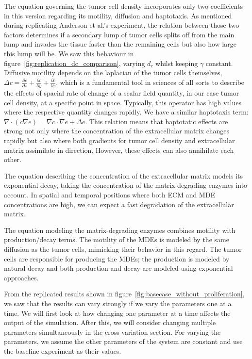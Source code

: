 The equation governing the tumor cell density incorporates only two coefficients in this version regarding its motility, diffusion and haptotaxis. As mentioned during replicating Anderson et al.'s experiment, the relation between those two factors determines if a secondary lump of tumor cells splits off from the main lump and invades the tissue faster than the remaining cells but also how large this lump will be. We saw this behaviour in figure~\ref{fig:replication_dc_comparison}, varying $d_c$ whilst keeping $\gamma$ constant. Diffusive motility depends on the laplacian of the tumor cells themselves, $\Delta c = \frac{\partial c}{\partial x} + \frac{\partial c}{\partial y} + \frac{\partial c}{\partial z}$, which is a fundamental tool in sciences of all sorts to describe the effects of spacial rate of change of a scalar field quantity, in our case tumor cell density, at a specific point in space. Typically, this operator has high values where the respective quantity changes rapidly. We have a similar haptotaxis term: $\nabla \cdot (c\nabla e) = \nabla c \cdot \nabla e + \Delta e$. This relation means that haptotatic effects are strong not only where the concentration of the extracellular matrix changes rapidly but also where both gradients for tumor cell density and extracellular matrix assimilate in direction. However, these effects can also annihilate each other.

The equation describing the concentration of the extracellular matrix models its exponential decay, taking the concentration of the matrix-degrading enzymes into account. In spatial and temporal positions where both ECM and MDE concentrations are high, we can expect a fast degradation of the extracellular matrix.

The equation modeling the matrix-degrading enzymes combines motility with production/decay terms. The motility of the MDEs is modeled by the same diffusion as the tumor cells, mimicking their behavior in this regard. The tumor cells are responsible for producing the MDEs; the production is modeled by natural decay and both production and decay are modeled using exponential approaches.

From the replicated results shown in figure~\ref{fig:basecase_without_proliferation}, we saw that the results can vary strongly if we vary the parameters one at a time. We will first look at how changing one parameter at a time affects the output of the simulation. After this, we will consider changing multiple parameters simultaneously in the cross-variation section. For varying the parameters, we assume the other parameters of the system are constant and use the baseline experiment as their values.

